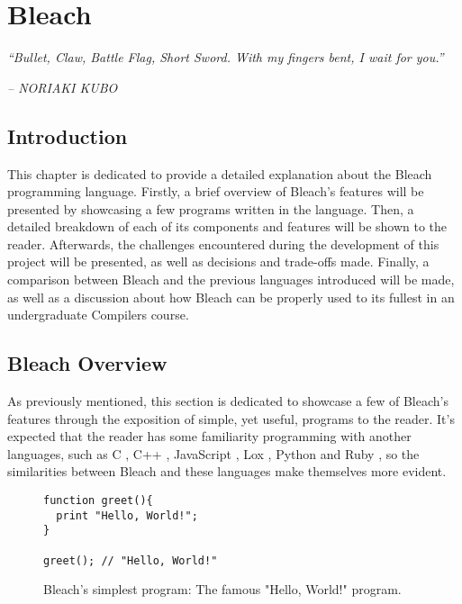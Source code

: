 \chapter{Bleach} \label{cap:metodologia}

\begin{displayquote}
    \begin{center}
        \textit{``Bullet, Claw, Battle Flag, Short Sword. With my fingers bent, I wait for you.''}
    \end{center}
\end{displayquote}

\begin{flushright}
   \textit{-- NORIAKI KUBO}
\end{flushright}

\section{Introduction}
This chapter is dedicated to provide a detailed explanation about the Bleach programming language. Firstly, a brief overview of Bleach's features will be presented by showcasing a few programs written in the language. Then, a detailed breakdown of each of its components and features will be shown to the reader. Afterwards, the challenges encountered during the development of this project will be presented, as well as decisions and trade-offs made. Finally, a comparison between Bleach and the previous languages introduced will be made, as well as a discussion about how Bleach can be properly used to its fullest in an undergraduate Compilers course.

\section{Bleach Overview}
As previously mentioned, this section is dedicated to showcase a few of Bleach's features through the exposition of simple, yet useful, programs to the reader. It's expected that the reader has some familiarity programming with another languages, such as C \cite{kernighan1988c}, C++ \cite{strousrup2000c++}, JavaScript \cite{javascript_language}, Lox \cite{nystrom2021crafting}, Python \cite{python_language} and Ruby \cite{ruby_language}, so the similarities between Bleach and these languages make themselves more evident. \newline

\begin{figure}
    \centering
    \begin{lstlisting}
function greet(){
  print "Hello, World!";
}

greet(); // "Hello, World!"
    \end{lstlisting}
    \caption{Bleach's simplest program: The famous "Hello, World!" program.}
\end{figure}

